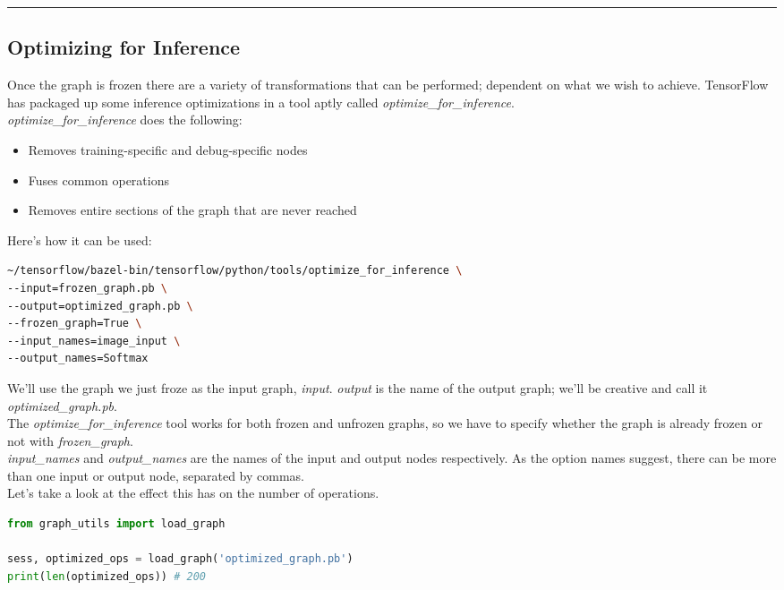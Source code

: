 \documentclass[12pt, draft]{report}
\begin{document}
\noindent\rule{\textwidth}{1pt}
\subsection*{Optimizing for Inference}
\begin{changemargin}{0.5cm}{2.0cm}
Once the graph is frozen there are a variety of transformations that can be performed; dependent on what we wish to achieve.
TensorFlow has packaged up some inference optimizations in a tool aptly called \textit{optimize\_for\_inference}.\vspace{0.5cm}\\
\textit{optimize\_for\_inference} does the following:
\begin{itemize}
    \item Removes training-specific and debug-specific nodes
    \item Fuses common operations
    \item Removes entire sections of the graph that are never reached
\end{itemize}
Here’s how it can be used:
\begin{lstlisting}[language=Bash]
~/tensorflow/bazel-bin/tensorflow/python/tools/optimize_for_inference \
--input=frozen_graph.pb \
--output=optimized_graph.pb \
--frozen_graph=True \
--input_names=image_input \
--output_names=Softmax
\end{lstlisting}
We'll use the graph we just froze as the input graph, \textit{input}. \textit{output} is the name of the output graph;
we’ll be creative and call it \textit{optimized\_graph.pb}.\vspace{0.5cm}\\
The \textit{optimize\_for\_inference} tool works for both frozen and unfrozen graphs, so we have to specify whether
the graph is already frozen or not with \textit{frozen\_graph}.\vspace{0.5cm}\\
\textit{input\_names} and \textit{output\_names} are the names of the input and output nodes respectively. As the
option names suggest, there can be more than one input or output node, separated by commas.\vspace{0.5cm}\\
Let’s take a look at the effect this has on the number of operations.
\begin{lstlisting}[language=Python]
from graph_utils import load_graph

sess, optimized_ops = load_graph('optimized_graph.pb')
print(len(optimized_ops)) # 200
\end{lstlisting}
\end{changemargin}
\end{document}
